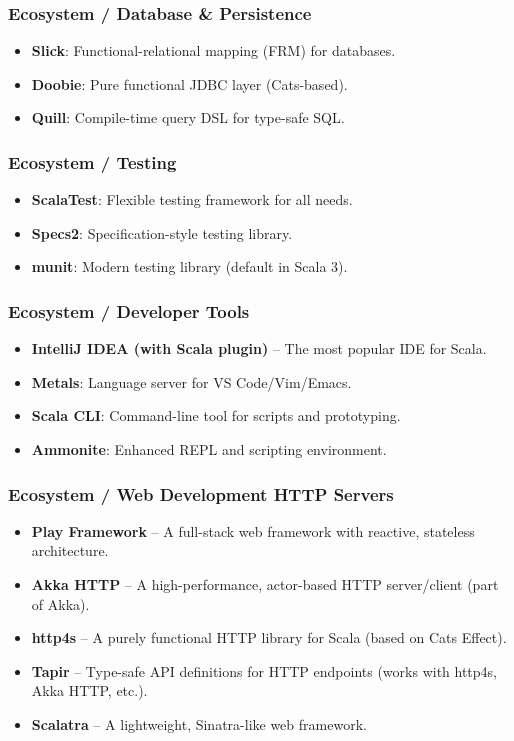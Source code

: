 \documentclass{beamer}
\begin{document}
\begin{frame}
\frametitle{Ecosystem / Database \& Persistence }
\begin{itemize}
  \item \textbf{Slick}: Functional-relational mapping (FRM) for databases.
  \item \textbf{Doobie}: Pure functional JDBC layer (Cats-based).
  \item \textbf{Quill}: Compile-time query DSL for type-safe SQL.
\end{itemize}
\end{frame}


\begin{frame}
\frametitle{Ecosystem / Testing }
\begin{itemize}
  \item \textbf{ScalaTest}: Flexible testing framework for all needs.
  \item \textbf{Specs2}: Specification-style testing library.
  \item \textbf{munit}: Modern testing library (default in Scala 3).
\end{itemize}
\end{frame}


\begin{frame}
\frametitle{Ecosystem / Developer Tools }
 \begin{itemize}
  \item \textbf{IntelliJ IDEA (with Scala plugin)} – The most popular IDE for Scala.
  \item \textbf{Metals}: Language server for VS Code/Vim/Emacs.
  \item \textbf{Scala CLI}: Command-line tool for scripts and prototyping.
  \item \textbf{Ammonite}: Enhanced REPL and scripting environment.
\end{itemize}
\end{frame}


\begin{frame}
\frametitle{Ecosystem / Web Development \text{\&} HTTP Servers }

\begin{itemize}
    \item \textbf{Play Framework} – A full-stack web framework with reactive, stateless architecture.
    \item \textbf{Akka HTTP} – A high-performance, actor-based HTTP server/client (part of Akka).
    \item \textbf{http4s} – A purely functional HTTP library for Scala (based on Cats Effect).
    \item \textbf{Tapir} – Type-safe API definitions for HTTP endpoints (works with http4s, Akka HTTP, etc.).
    \item \textbf{Scalatra} – A lightweight, Sinatra-like web framework.
\end{itemize}

\end{frame}
\end{document}
